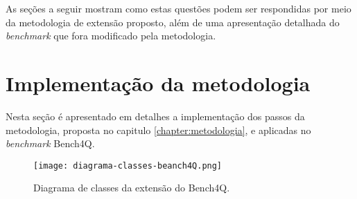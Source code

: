 



As seções a seguir mostram como estas questões podem ser respondidas por meio da metodologia de extensão proposto, além de uma apresentação detalhada do \textit{benchmark} que fora modificado pela metodologia.




\section{Implementação da metodologia}

Nesta seção é apresentado em detalhes a implementação dos passos da metodologia, proposta no capitulo \ref{chapter:metodologia}, e aplicadas no \textit{benchmark} Bench4Q.

\begin{figure}[htb]
	\caption{Diagrama de classes da extensão do Bench4Q.}
	\label{fig:diagrama-classes}
	\centering
	\texttt{[image: diagrama-classes-beanch4Q.png]}	
\end{figure}
	
